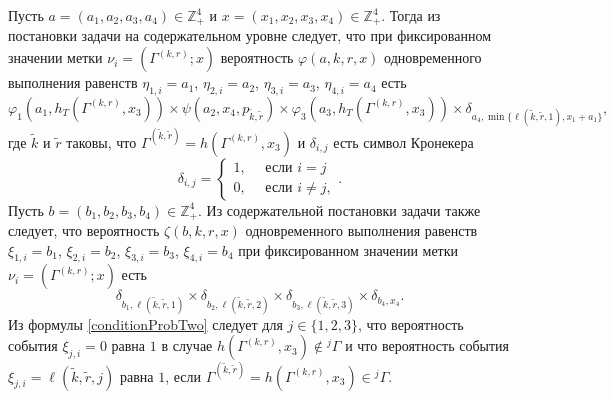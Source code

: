 \documentclass[a4paper,12pt,russian]{extarticle}
\begin{document}
Пусть $a=(a_1, a_2, a_3, a_4) \in \mathbb{Z}_+^4$ и $x=(x_1, x_2, x_3, x_4) \in \mathbb{Z}_+^4$. Тогда из постановки задачи на содержательном уровне следует, что при фиксированном значении метки $\nu_i=(\Gamma^{(k,r)}; x)$ вероятность $\varphi(a,k,r,x)$ одновременного выполнения равенств $\eta_{1,i}=a_1$, $\eta_{2,i}=a_2$, $\eta_{3,i}=a_3$, $\eta_{4,i}=a_4$ есть 
\begin{equation}
\varphi_1(a_1,h_T(\Gamma^{(k,r)},x_3)) \times \psi(a_2,x_4, p_{\tilde{k},\tilde{r}}) \times \varphi_3(a_3,h_T(\Gamma^{(k,r)},x_3))
\times \delta_{a_4,\min{\{\ell(\tilde{k},\tilde{r},1), x_1+a_1}\}},
\label{conditionProbOne}
\end{equation}
где $\tilde{k}$ и $\tilde{r}$ таковы, что $\Gamma^{(\tilde{k},\tilde{r})}=h(\Gamma^{(k,r)},x_3)$ и $\delta_{i,j}$ есть символ Кронекера
\begin{equation*}
\delta_{i,j}=\begin{cases} 1, \quad \text{ если }i=j\\0, \quad \text{ если } i\neq j,
\end{cases}.
\end{equation*}
Пусть $b=(b_1, b_2, b_3, b_4) \in \mathbb{Z}_+^4$. Из содержательной постановки задачи также следует, что вероятность $\zeta(b, k, r, x)$ одновременного выполнения равенств $\xi_{1,i}=b_1$, $\xi_{2,i}=b_2$, $\xi_{3,i}=b_3$, $\xi_{4,i}=b_4$ при фиксированном значении метки $\nu_i=(\Gamma^{(k,r)}; x)$ есть
\begin{equation}
\delta_{b_1,\ell(\tilde{k},\tilde{r},1)} \times \delta_{b_2,\ell(\tilde{k},\tilde{r},2)} \times 
\delta_{b_3,\ell(\tilde{k},\tilde{r},3)} \times \delta_{b_4,x_4}.
\label{conditionProbTwo}
\end{equation}
Из формулы \eqref{conditionProbTwo} следует для $j\in \{1, 2, 3\}$, что вероятность события $\xi_{j,i}=0$ равна $1$ в случае $h(\Gamma^{(k,r)},x_3)\notin {}^j\Gamma$ и что вероятность события $\xi_{j,i}=\ell(\tilde{k},\tilde{r},j)$ равна $1$, если $\Gamma^{(\tilde{k},\tilde{r})}=h(\Gamma^{(k,r)},x_3)\in {}^j\Gamma$.
\end{document}
